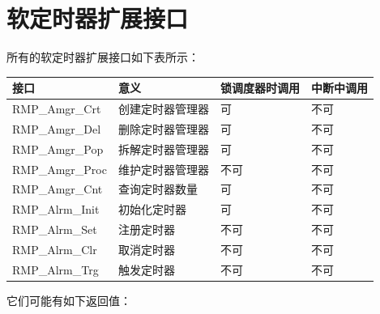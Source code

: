 \section{软定时器扩展接口}\label{sec:soft-timer-extension-interface}

所有的软定时器扩展接口如下表所示：

\label{tab:soft-timer-extension-interface-summary}

{\def\LTcaptype{none} %
\begin{longtable}[]{@{}
  >{\raggedright\arraybackslash}p{}
  >{\raggedright\arraybackslash}p{}
  >{\raggedright\arraybackslash}p{}
  >{\raggedright\arraybackslash}p{}@{}}
\toprule\noalign{}
\begin{minipage}[b]{\linewidth}\raggedright
接口
\end{minipage} & \begin{minipage}[b]{\linewidth}\raggedright
意义
\end{minipage} & \begin{minipage}[b]{\linewidth}\raggedright
锁调度器时调用
\end{minipage} & \begin{minipage}[b]{\linewidth}\raggedright
中断中调用
\end{minipage} \\
\midrule\noalign{}
\endhead
\bottomrule\noalign{}
\endlastfoot
RMP\_Amgr\_Crt & 创建定时器管理器 & 可 & 不可 \\
RMP\_Amgr\_Del & 删除定时器管理器 & 可 & 不可 \\
RMP\_Amgr\_Pop & 拆解定时器管理器 & 可 & 不可 \\
RMP\_Amgr\_Proc & 维护定时器管理器 & 不可 & 不可 \\
RMP\_Amgr\_Cnt & 查询定时器数量 & 可 & 不可 \\
RMP\_Alrm\_Init & 初始化定时器 & 可 & 不可 \\
RMP\_Alrm\_Set & 注册定时器 & 不可 & 不可 \\
RMP\_Alrm\_Clr & 取消定时器 & 不可 & 不可 \\
RMP\_Alrm\_Trg & 触发定时器 & 不可 & 不可 \\
\end{longtable}
}

它们可能有如下返回值：

\label{tab:possible-return-values-of-the-soft-timer-extension-interface}


